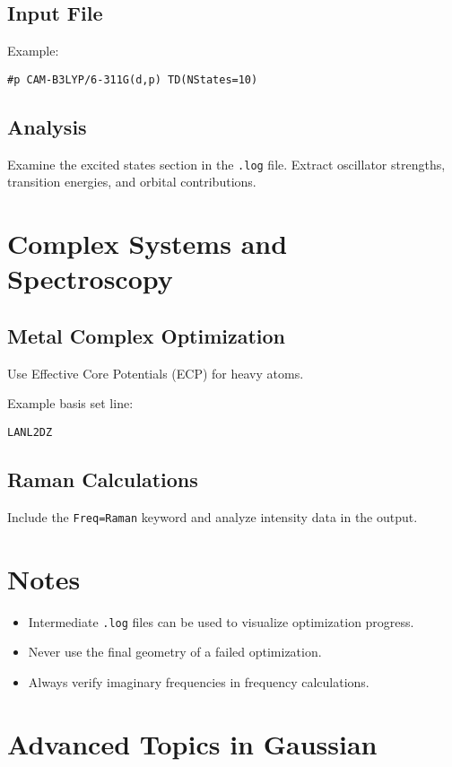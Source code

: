 \subsection*{Input File}
Example:

\begin{verbatim}
#p CAM-B3LYP/6-311G(d,p) TD(NStates=10)
\end{verbatim}

\subsection*{Analysis}
Examine the excited states section in the \texttt{.log} file. Extract oscillator strengths, transition energies, and orbital contributions.

\section{Complex Systems and Spectroscopy}

\subsection*{Metal Complex Optimization}
Use Effective Core Potentials (ECP) for heavy atoms.

Example basis set line:

\begin{verbatim}
LANL2DZ
\end{verbatim}

\subsection*{Raman Calculations}
Include the \texttt{Freq=Raman} keyword and analyze intensity data in the output.

\section*{Notes}
\begin{itemize}
\item Intermediate \texttt{.log} files can be used to visualize optimization progress.
\item Never use the final geometry of a failed optimization.
\item Always verify imaginary frequencies in frequency calculations.
\end{itemize}


\section*{Advanced Topics in Gaussian}

